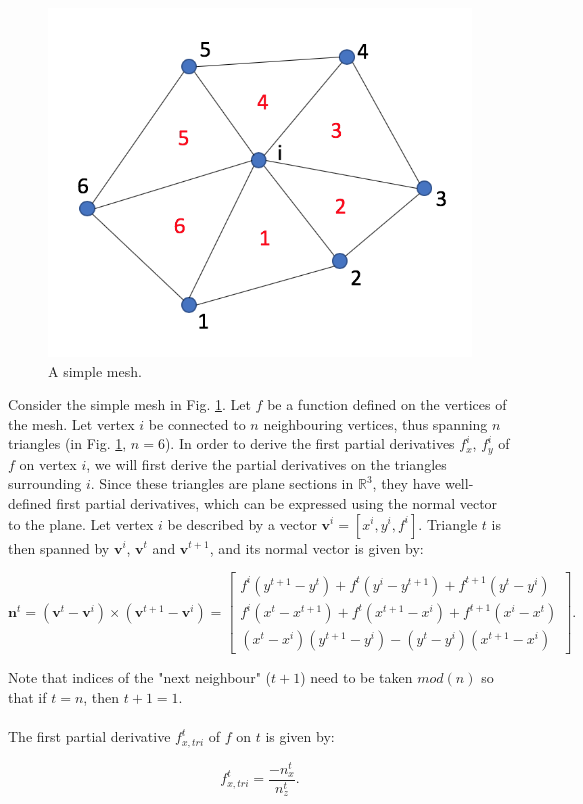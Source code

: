 \documentclass{article}
\begin{document}
\begin{figure}[H] \label{fig:mesh_disc_01}
  \includegraphics[width=0.3\linewidth]{Fig_mesh_disc_01.png}
  \caption{A simple mesh.}
\end{figure}

Consider the simple mesh in Fig. \ref{fig:mesh_disc_01}. Let $f$ be a function defined on the vertices of the mesh. Let vertex $i$ be connected to $n$ neighbouring vertices, thus spanning $n$ triangles (in Fig. \ref{fig:mesh_disc_01}, $n=6$). In order to derive the first partial derivatives $f_x^i$, $f_y^i$ of $f$ on vertex $i$, we will first derive the partial derivatives on the triangles surrounding $i$. Since these triangles are plane sections in $\mathbb{R}^{3}$, they have well-defined first partial derivatives, which can be expressed using the normal vector to the plane. Let vertex $i$ be described by a vector $\textbf{v}^i=\left[x^i,y^i,f^i\right]$. Triangle $t$ is then spanned by $\textbf{v}^i$, $\textbf{v}^t$ and $\textbf{v}^{t+1}$, and its normal vector is given by:

\begin{equation} \label{eq:disc_normvec}
 \textbf{n}^t = (\textbf{v}^t - \textbf{v}^i) \times (\textbf{v}^{t+1} - \textbf{v}^i) = \begin{bmatrix}
 f^i (y^{t+1} - y^t) + f^t (y^i - y^{t+1}) + f^{t+1} (y^t - y^i) \\
 f^i (x^t - x^{t+1}) + f^t (x^{t+1} - x^i) + f^{t+1} (x^i - x^t) \\ 
 (x^t - x^i) (y^{t+1} - y^i) - (y^t - y^i) (x^{t+1} - x^i)
 \end{bmatrix}.
\end{equation}

Note that indices of the "next neighbour" ($t+1$) need to be taken $mod(n)$ so that if $t=n$, then $t+1=1$.\\
\\
The first partial derivative $f_{x,tri}^t$ of $f$ on $t$ is given by:

\begin{equation} \label{eq:disc_fxtri}
f_{x,tri}^t = \frac{-n_x^t}{n_z^t}.
\end{equation}
\end{document}
